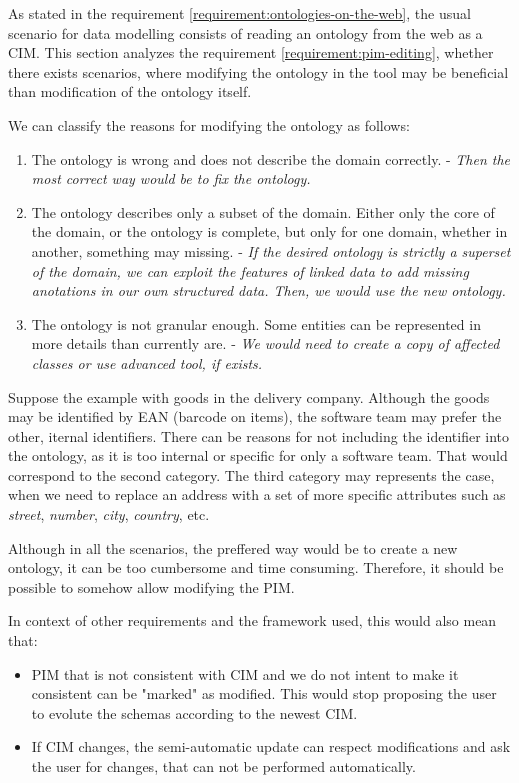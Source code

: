 As stated in the requirement \ref{requirement:ontologies-on-the-web}, the usual scenario for data modelling consists of reading an ontology from the web as a CIM. This section analyzes the requirement \ref{requirement:pim-editing}, whether there exists scenarios, where modifying the ontology in the tool may be beneficial than modification of the ontology itself.

We can classify the reasons for modifying the ontology as follows:

\begin{enumerate}
    \item The ontology is wrong and does not describe the domain correctly. - \textit{Then the most correct way would be to fix the ontology.}
    \item The ontology describes only a subset of the domain. Either only the core of the domain, or the ontology is complete, but only for one domain, whether in another, something may missing. - \textit{If the desired ontology is strictly a superset of the domain, we can exploit the features of linked data to add missing anotations in our own structured data. Then, we would use the new ontology.}
    \item The ontology is not granular enough. Some entities can be represented in more details than currently are. - \textit{We would need to create a copy of affected classes or use advanced tool, if exists.}
\end{enumerate}

Suppose the example with goods in the delivery company. Although the goods may be identified by EAN (barcode on items), the software team may prefer the other, iternal identifiers. There can be reasons for not including the identifier into the ontology, as it is too internal or specific for only a software team. That would correspond to the second category. The third category may represents the case, when we need to replace an address with a set of more specific attributes such as \textit{street}, \textit{number}, \textit{city}, \textit{country}, etc.

Although in all the scenarios, the preffered way would be to create a new ontology, it can be too cumbersome and time consuming. Therefore, it should be possible to somehow allow modifying the PIM.

\smallskip

In context of other requirements and the framework used, this would also mean that:
\begin{itemize}
    \item PIM that is not consistent with CIM and we do not intent to make it consistent can be "marked" as modified. This would stop proposing the user to evolute the schemas according to the newest CIM.
    \item If CIM changes, the semi-automatic update can respect modifications and ask the user for changes, that can not be performed automatically.
\end{itemize}

